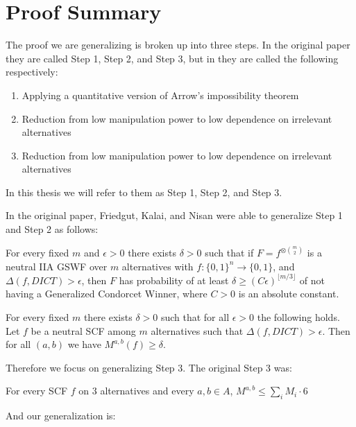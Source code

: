\section {Proof Summary}

	The proof we are generalizing is broken up into three steps. In the original paper they are called Step 1, Step 2, and Step 3, but in \cite{friedgut2011quantitative} they are called the following respectively:
	\begin{enumerate}
		\item Applying a quantitative version of Arrow's impossibility theorem
		\item Reduction from low manipulation power to low dependence on irrelevant alternatives
		\item Reduction from low manipulation power to low dependence on irrelevant alternatives
	\end{enumerate}
	In this thesis we will refer to them as Step 1, Step 2, and Step 3.

	In the original paper, Friedgut, Kalai, and Nisan were able to generalize Step 1 and Step 2 as follows:

	\begin{lemma}
		For every fixed $m$ and $\epsilon > 0$ there exists $\delta > 0$ such that if $F = f^{\otimes \binom{m}{2}}$ is a neutral IIA GSWF over $m$ alternatives with $f : \{0,1\}^n \rightarrow \{0,1\}$, and $\Delta(f, DICT) > \epsilon$, then $F$ has probability of at least $\delta \ge (C\epsilon)^{\lfloor m/3 \rfloor}$ of not having a Generalized Condorcet Winner, where $C > 0$ is an absolute constant.
	\end{lemma}

	\begin{lemma}
		For every fixed $m$ there exists $\delta > 0$ such that for all $\epsilon > 0$ the following holds. Let $f$ be a neutral SCF among $m$ alternatives such that $\Delta(f, DICT) > \epsilon$. Then for all $(a,b)$ we have $M^{a,b}(f) \ge \delta$.
	\end{lemma}

	Therefore we focus on generalizing Step 3. The original Step 3 was:

	\begin{lemma}
		For every SCF $f$ on $3$ alternatives and every $a,b \in A$, $M^{a,b} \le \sum_i M_i \cdot 6$
	\end{lemma}

	And our generalization is:

